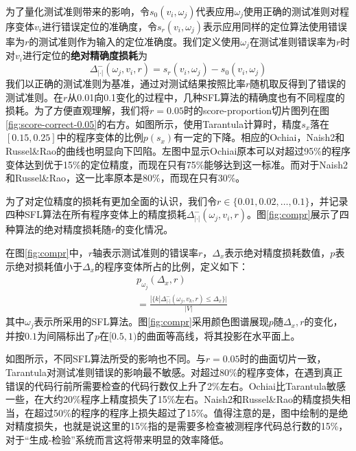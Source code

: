 为了量化测试准则带来的影响，令$s_0(v_i, \omega_j)$代表应用$\omega_j$使用正确的测试准则对程序变体$v_i$进行错误定位的准确度，令$s_r(v_i, \omega_j)$表示应用同样的定位算法使用错误率为$r$的测试准则作为输入的定位准确度。我们定义使用$\omega_j$在测试准则错误率为$r$时对$v_i$进行定位的\textbf{绝对精确度损耗}为
$$
\Delta_{|\cdot|}^{-}(\omega_j, v_i, r) = s_r(v_i, \omega_j) - s_0(v_i, \omega_j)
$$
我们以正确的测试准则为基准，通过对测试结果按照比率$r$随机取反得到了错误的测试准则。在$r$从0.01向0.1变化的过程中，几种SFL算法的精确度也有不同程度的损耗。为了方便直观理解，我们将$r=0.05$时的score-proportion切片图列在图\ref{fig:score-correct-0.05}的右方。如图所示，使用Tarantula计算时，精度$s_x$落在$[0.15, 0.25]$中的程序变体的比例$p(s_x)$有一定的下降。相应的Ochiai，Naish2和Russel\&Rao的曲线也明显向下凹陷。左图中显示Ochiai原本可以对超过95\%的程序变体达到优于15\%的定位精度，而现在只有75\%能够达到这一标准。而对于Naish2和Russel\&Rao，这一比率原本是80\%，而现在只有30\%。

为了对定位精度的损耗有更加全面的认识，我们令$r\in \{0.01, \allowbreak 0.02, \ldots, 0.1\}$，并记录四种SFL算法在所有程序变体上的精度损耗$\Delta_{|\cdot|}^{-}(\omega_j, v_i, r)$。图\ref{fig:compr}展示了四种算法的绝对精度损耗随$r$的变化情况。

在图\ref{fig:compr}中，$r$轴表示测试准则的错误率$r$，$\Delta_x$表示绝对精度损耗数值，$p$表示绝对损耗值小于$\Delta_x$的程序变体所占的比例，定义如下：
\begin{equation*}
\begin{aligned}
& p_{\omega_j}(\Delta_x, r) \\
& = \frac{|\{k|\Delta_{|\cdot|}^{-}(\omega_j, v_k, r) \le \Delta_x\}|}{|V|}
\end{aligned}
\end{equation*}
其中$\omega_j$表示所采用的SFL算法。图\ref{fig:compr}采用颜色图谱展现$p$随$\Delta_x, r$的变化，并按$0.1$为间隔标出了$p$在$[0.5, 1)$的曲面等高线，将其投影在水平面上。

如图所示，不同SFL算法所受的影响也不同。与$r=0.05$时的曲面切片一致，Tarantula对测试准则错误的影响最不敏感。对超过80\%的程序变体，在遇到真正错误的代码行前所需要检查的代码行数仅上升了2\%左右。Ochiai比Tarantula敏感一些，在大约20\%程序上精度损失了15\%左右。Naish2和Russel\&Rao的精度损失相当，在超过50\%的程序的程序上损失超过了15\%。值得注意的是，图中绘制的是绝对精度损失，也就是说这里的15\%指的是需要多检查被测程序代码总行数的15\%，对于“生成-检验”系统而言这将带来明显的效率降低。

